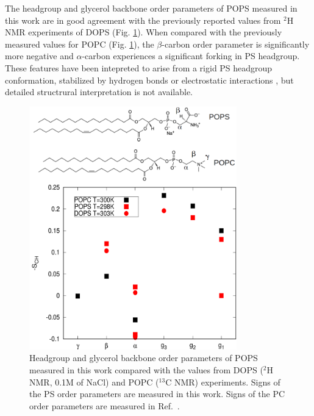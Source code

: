 \documentclass[aps,prl,superscriptaddress,twocolumn]{revtex4}
\begin{document}
The headgroup and glycerol backbone order parameters of 
POPS measured in this work are in good agreement with the previously reported
values from $^2$H NMR experiments of DOPS \cite{browning80} (Fig. \ref{HGorderParameters}).
When compared with the previously measured values for POPC \cite{ferreira13} (Fig. \ref{HGorderParameters}),
the $\beta$-carbon order parameter is significantly more negative and $\alpha$-carbon
experiences a significant forking in PS headgroup.
These features have been intepreted to arise from a rigid PS headgroup
conformation, stabilized by hydrogen bonds or electrostatic
interactions \cite{browning80,buldt81}, but detailed structrural interpretation is not
available. 
\begin{figure}[]
  \centering
  \includegraphics[width=9.0cm]{../Figs/PCPScomp.pdf}
  \caption{\label{HGorderParameters}
    Headgroup and glycerol backbone order parameters of POPS measured in this work compared
    with the values from DOPS ($^2$H NMR, 0.1M of NaCl) \cite{browning80} and 
    POPC  ($^{13}$C NMR) \cite{ferreira13} experiments. Signs of the PS order parameters
    are measured in this work. Signs of the PC order parameters are measured in Ref.~\cite{ferreira16}.
  }
\end{figure}


\end{document}
